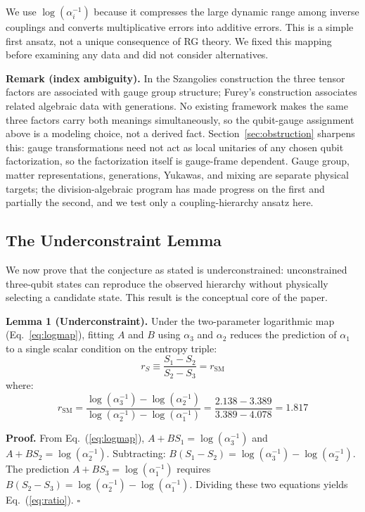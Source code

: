 \documentclass[11pt]{article}
\newcommand{\rSM}{r_{\mathrm{SM}}}
\begin{document}
We use $\log(\alpha_i^{-1})$ because it compresses the large dynamic range among inverse couplings and converts multiplicative errors into additive errors. This is a simple first ansatz, not a unique consequence of RG theory. We fixed this mapping before examining any data and did not consider alternatives.

\textbf{Remark (index ambiguity).} In the Szangolies construction the three tensor factors are associated with gauge group structure; Furey's construction associates related algebraic data with generations. No existing framework makes the same three factors carry both meanings simultaneously, so the qubit-gauge assignment above is a modeling choice, not a derived fact. Section~\ref{sec:obstruction} sharpens this: gauge transformations need not act as local unitaries of any chosen qubit factorization, so the factorization itself is gauge-frame dependent. Gauge group, matter representations, generations, Yukawas, and mixing are separate physical targets; the division-algebraic program has made progress on the first and partially the second, and we test only a coupling-hierarchy ansatz here.

\subsection{The Underconstraint Lemma}
\label{sec:underconstraint}

We now prove that the conjecture as stated is underconstrained: unconstrained three-qubit states can reproduce the observed hierarchy without physically selecting a candidate state. This result is the conceptual core of the paper.

\textbf{Lemma 1 (Underconstraint).}\label{lem:under} Under the two-parameter logarithmic map (Eq.~\ref{eq:logmap}), fitting $A$ and $B$ using $\alpha_3$ and $\alpha_2$ reduces the prediction of $\alpha_1$ to a single scalar condition on the entropy triple:
\begin{equation}
r_S \equiv \frac{S_1 - S_2}{S_2 - S_3} = \rSM
\label{eq:ratio}
\end{equation}
where:
\begin{equation}
\rSM = \frac{\log(\alpha_3^{-1}) - \log(\alpha_2^{-1})}{\log(\alpha_2^{-1}) - \log(\alpha_1^{-1})}
     = \frac{2.138 - 3.389}{3.389 - 4.078}
     = 1.817
\label{eq:rsm}
\end{equation}

\textbf{Proof.} From Eq.~(\ref{eq:logmap}), $A + B S_1 = \log(\alpha_3^{-1})$ and $A + B S_2 = \log(\alpha_2^{-1})$. Subtracting: $B(S_1 - S_2) = \log(\alpha_3^{-1}) - \log(\alpha_2^{-1})$. The prediction $A + B S_3 = \log(\alpha_1^{-1})$ requires $B(S_2 - S_3) = \log(\alpha_2^{-1}) - \log(\alpha_1^{-1})$. Dividing these two equations yields Eq.~(\ref{eq:ratio}). \hfill$\square$
\end{document}
